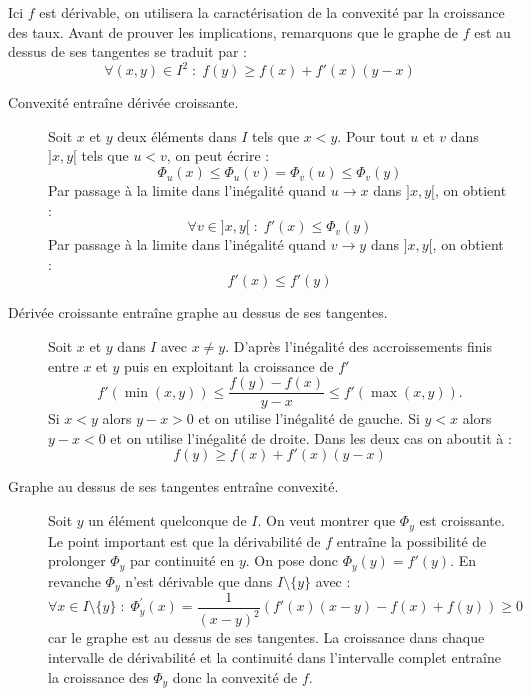 \begin{demo} Ici $f$ est dérivable, on utilisera la caractérisation de la convexité par la croissance des taux. Avant de prouver les implications, remarquons que le graphe de $f$ est au dessus de ses tangentes se traduit par :
\begin{displaymath}
 \forall (x,y)\in I^2 \;:\; f(y)\geq f(x) + f'(x)(y-x) 
\end{displaymath}

 \begin{description}
 \item [Convexité entraîne dérivée croissante.] Soit $x$ et $y$ deux éléments dans $I$ tels que $x<y$. Pour tout $u$ et $v$ dans $]x,y[$ tels que $u<v$, on peut écrire :
\begin{displaymath}
 \Phi_u(x)\leq\Phi_u(v)=\Phi_v(u)\leq\Phi_v(y)
\end{displaymath}
 Par passage à la limite dans l'inégalité quand $u\rightarrow x$ dans $]x,y[$, on obtient :
\begin{displaymath}
 \forall v\in ]x,y[\;:\; f'(x)\leq \Phi_v(y)
\end{displaymath}
 Par passage à la limite dans l'inégalité quand $v\rightarrow y$ dans $]x,y[$, on obtient :
\begin{displaymath}
  f'(x)\leq f'(y)
\end{displaymath}

 \item [Dérivée croissante entraîne graphe au dessus de ses tangentes.] 
 Soit $x$ et $y$ dans $I$ avec $x\neq y$. D'après l'inégalité des accroissements finis entre $x$ et $y$ puis en exploitant la croissance de $f'$
\begin{displaymath}
 f'(\min(x,y))\leq \dfrac{f(y)-f(x)}{y-x}\leq f'(\max(x,y)).
\end{displaymath}
Si $x<y$ alors $y-x>0$ et on utilise l'inégalité de gauche. Si $y<x$ alors $y-x<0$ et on utilise l'inégalité de droite. Dans les deux cas on aboutit à :
\begin{displaymath}
 f(y)\geq f(x) + f'(x)(y-x) 
\end{displaymath}

 \item [Graphe au dessus de ses tangentes entraîne convexité.] Soit $y$ un élément quelconque de $I$. On veut montrer que $\Phi_y$ est croissante. Le point important est que la dérivabilité de $f$ entraîne la possibilité de prolonger $\Phi_y$ par continuité en $y$. On pose donc $\Phi_y(y)=f'(y)$. En revanche $\Phi_y$ n'est dérivable que dans $I\setminus\{y\}$ avec :
\begin{displaymath}
 \forall x\in I\setminus\{y\}\;:\; \Phi_y ^\prime (x)=\dfrac{1}{(x-y)^2}\left(f'(x)(x-y)- f(x)+f(y)\right) \geq 0
\end{displaymath}
car le graphe est au dessus de ses tangentes. La croissance dans chaque intervalle de dérivabilité et la continuité dans l'intervalle complet entraîne la croissance des $\Phi_y$ donc la convexité de $f$.
\end{description}
\end{demo}
